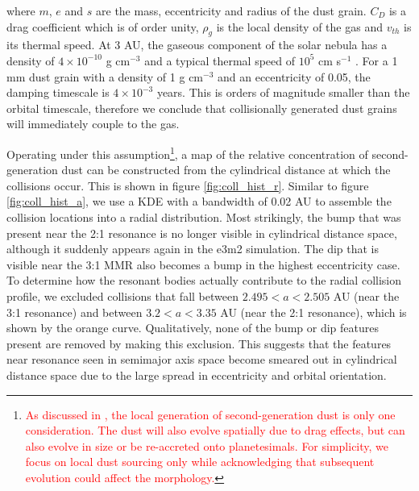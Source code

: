 \documentclass[twocolumn]{aastex63}
\newcommand{\ACBc}[1]{\textcolor{red}{#1}}
\begin{document}
\noindent where $m$, $e$ and $s$ are the mass, eccentricity and radius of the dust grain. $C_{D}$ is a drag coefficient which is of order unity, $
\rho_{g}$ is the local density of the gas and $v_{th}$ is its thermal speed. At 3 AU, the gaseous component of the solar nebula has a density of $4 
\times 10^{-10}$ g cm$^{-3}$ and a typical thermal speed of $10^{5}$ cm s$^{-1}$ \citep{1981PThPS..70...35H}. For a 1 mm dust grain with a 
density of 1 g cm$^{-3}$ and an eccentricity of 0.05, the damping timescale is $4 \times 10^{-3}$ years. This is orders of magnitude smaller than the 
orbital timescale, therefore we conclude that collisionally generated dust grains will immediately couple to the gas.

Operating under this assumption\footnote{\ACBc{As discussed in \cite{2017ApJ...850..103B}, the local generation of second-generation dust is only one consideration.  The dust will also evolve spatially due to drag effects, but can also evolve in size or be re-accreted onto planetesimals. For simplicity, we focus on local dust sourcing only while acknowledging that subsequent evolution could affect the morphology.}}, a map of the relative concentration of second-generation dust can be constructed from the cylindrical 
distance at which the collisions occur. This is shown in figure \ref{fig:coll_hist_r}. Similar to figure \ref{fig:coll_hist_a}, we use a KDE with a bandwidth 
of 0.02 AU to assemble the collision locations into a radial distribution. Most strikingly, the bump that was present near the 2:1 resonance is no 
longer visible in cylindrical distance space, although it suddenly appears again in the e3m2 simulation. The dip that is visible near the 3:1 MMR 
also becomes a bump in the highest eccentricity case. To determine how the resonant bodies actually contribute to the radial collision 
profile, we excluded collisions that fall between $2.495 < a < 2.505$ AU (near the 3:1 resonance) and between $3.2 < a < 3.35$ AU (near the 2:1 
resonance), which is shown by the orange curve. Qualitatively, none of the bump or dip features present are removed by making this exclusion. This 
suggests that the features near resonance seen in semimajor axis space become smeared out in cylindrical distance space due to the large spread 
in eccentricity and orbital orientation.
\end{document}
